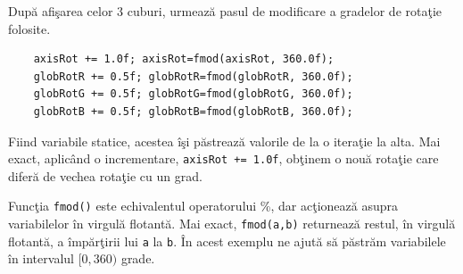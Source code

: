 Dup\u a afi\c sarea celor $3$ cuburi, urmeaz\u a pasul de modificare a gradelor de rota\c tie folosite.
\begin{lstlisting}
    axisRot += 1.0f; axisRot=fmod(axisRot, 360.0f);
    globRotR += 0.5f; globRotR=fmod(globRotR, 360.0f);
    globRotG += 0.5f; globRotG=fmod(globRotG, 360.0f);
    globRotB += 0.5f; globRotB=fmod(globRotB, 360.0f);
\end{lstlisting}
Fiind variabile statice, acestea \^ i\c si p\u astreaz\u a valorile de la o itera\c tie la alta. Mai exact, aplic\^ and o incrementare, {\tt axisRot += 1.0f}, ob\c tinem o nou\u a rota\c tie care difer\u a de vechea rota\c tie cu un grad. 

Func\c tia {\tt fmod()} este echivalentul operatorului \%, dar ac\c tioneaz\u a asupra va\-ria\-bi\-le\-lor \^ in virgul\u a flotant\u a. Mai exact, {\tt fmod(a,b)} returneaz\u a restul, \^ in virgul\u a flotant\u a, a \^ imp\u ar\c tirii lui {\tt a} la {\tt b}. \^ In acest exemplu ne ajut\u a s\u a p\u astr\u am variabilele \^ in intervalul $[0, 360)$ grade.